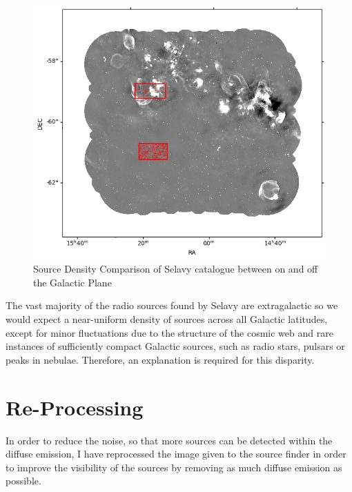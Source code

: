 \begin{figure}
    \centering
    \includegraphics[width=1\linewidth]{Thesis_Template//Figures/selavy_source_density.png}
    \caption{Source Density Comparison of Selavy catalogue between on and off the Galactic Plane}
    \label{fig:source density in selavy}
\end{figure}

The vast majority of the radio sources found by Selavy are extragalactic so we would expect a near-uniform density of sources across all Galactic latitudes, except for minor fluctuations due to the structure of the cosmic web and rare instances of sufficiently compact Galactic sources, such as radio stars, pulsars or peaks in nebulae. Therefore, an explanation is required for this disparity.


\section{Re-Processing} 

In order to reduce the noise, so that more sources can be detected within the diffuse emission, I have reprocessed the image given to the source finder in order to improve the visibility of the sources by removing as much diffuse emission as possible.

